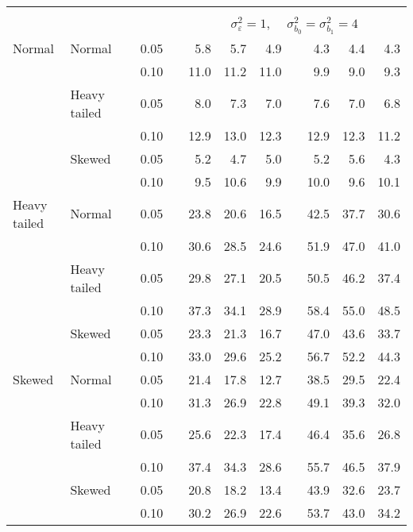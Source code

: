 \begin{table}[ht]
\begin{scriptsize}
\begin{center}
\begin{tabular}{ll p{.1cm} c p{.1cm} rrr p{.1cm} rrr}
&&&&&&&&&&&\\
& && && \multicolumn{7}{c}{$\sigma_{\varepsilon}^2 = 1$, \ \ $\sigma_{b_0}^2 = \sigma_{b_1}^2 = 4$} \\ \cline{6-12}
Normal       & Normal       && 0.05 &&   5.8 & 5.7 & 4.9 &   & 4.3 & 4.4 & 4.3 \\ 
             &              && 0.10 &&   11.0 & 11.2 & 11.0 &   & 9.9 & 9.0 & 9.3 \\ 
             & Heavy tailed && 0.05 &&   8.0 & 7.3 & 7.0 &   & 7.6 & 7.0 & 6.8 \\ 
             &              && 0.10 &&   12.9 & 13.0 & 12.3 &   & 12.9 & 12.3 & 11.2 \\ 
             & Skewed       && 0.05 &&   5.2 & 4.7 & 5.0 &   & 5.2 & 5.6 & 4.3 \\ 
             &              && 0.10 &&   9.5 & 10.6 & 9.9 &   & 10.0 & 9.6 & 10.1 \\ 
Heavy tailed & Normal       && 0.05 &&   23.8 & 20.6 & 16.5 &   & 42.5 & 37.7 & 30.6 \\ 
             &              && 0.10 &&   30.6 & 28.5 & 24.6 &   & 51.9 & 47.0 & 41.0 \\ 
             & Heavy tailed && 0.05 &&   29.8 & 27.1 & 20.5 &   & 50.5 & 46.2 & 37.4 \\ 
             &              && 0.10 &&   37.3 & 34.1 & 28.9 &   & 58.4 & 55.0 & 48.5 \\ 
             & Skewed       && 0.05 &&   23.3 & 21.3 & 16.7 &   & 47.0 & 43.6 & 33.7 \\ 
             &              && 0.10 &&   33.0 & 29.6 & 25.2 &   & 56.7 & 52.2 & 44.3 \\ 
Skewed       & Normal       && 0.05 &&   21.4 & 17.8 & 12.7 &   & 38.5 & 29.5 & 22.4 \\ 
             &              && 0.10 &&   31.3 & 26.9 & 22.8 &   & 49.1 & 39.3 & 32.0 \\ 
             & Heavy tailed && 0.05 &&   25.6 & 22.3 & 17.4 &   & 46.4 & 35.6 & 26.8 \\ 
             &              && 0.10 &&   37.4 & 34.3 & 28.6 &   & 55.7 & 46.5 & 37.9 \\ 
             & Skewed       && 0.05 &&   20.8 & 18.2 & 13.4 &   & 43.9 & 32.6 & 23.7 \\ 
             &              && 0.10 &&   30.2 & 26.9 & 22.6 &   & 53.7 & 43.0 & 34.2 \\ 

\hline
\end{tabular}
\end{center}
\end{scriptsize}
\end{table}


